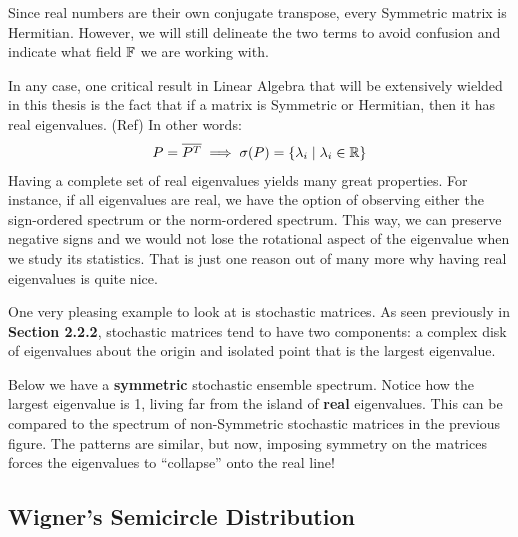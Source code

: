 \begin{remark}
Since real numbers are their own conjugate transpose, every Symmetric matrix is Hermitian. However, we will still delineate the two terms to avoid confusion and indicate what field $\mathbb{F}$ we are working with.
\end{remark}

In any case, one critical result in Linear Algebra that will be extensively wielded in this thesis is the fact that if a matrix is Symmetric or Hermitian, then it has real eigenvalues. (Ref) In other words:
\begin{align*}
P = \overline{P^{T}} \implies \sigma(P) = \{\lambda_i \mid \lambda_i \in \mathbb{R}\}
\end{align*}
Having a complete set of real eigenvalues yields many great properties. For instance, if all eigenvalues are real, we have the option of observing either the sign-ordered spectrum or the norm-ordered spectrum.
This way, we can preserve negative signs and we would not lose the rotational aspect of the eigenvalue when we study its statistics. That is just one reason out of many more why having real eigenvalues is quite nice.


One very pleasing example to look at is stochastic matrices.
As seen previously in \textbf{Section 2.2.2}, stochastic matrices tend to have two components: a complex disk of eigenvalues about the origin and isolated point that is the largest eigenvalue.

Below we have a \textbf{symmetric} stochastic ensemble spectrum. Notice how the largest eigenvalue is 1, living far from the island of \textbf{real} eigenvalues.
This can be compared to the spectrum of non-Symmetric stochastic matrices in the previous figure.
The patterns are similar, but now, imposing symmetry on the matrices forces the eigenvalues to ``collapse'' onto the real line!


\newpage
\subsection{Wigner's Semicircle Distribution}

